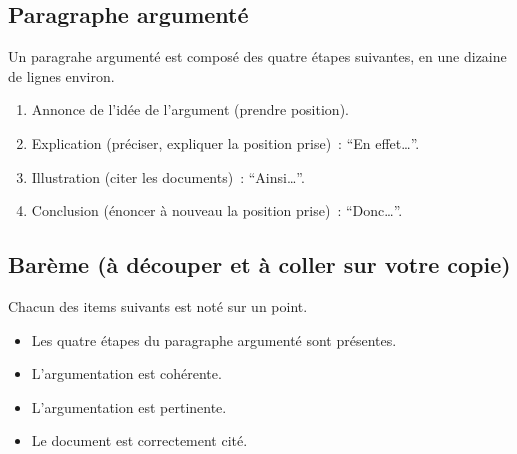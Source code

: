 \documentclass[11pt]{article}
\newcommand{\cuthere}{\noindent%
  \dotfill \raisebox{-.25em}{\faScissors}%
  \dotfill \raisebox{-.25em}{\faScissors}%
  \dotfill \raisebox{-.25em}{\faScissors}%
  \dotfill \raisebox{-.25em}{\faScissors}%
  \dotfill}
\begin{document}
\subsection*{Paragraphe argumenté}

\noindent Un paragrahe argumenté est composé des quatre étapes suivantes, en une dizaine de lignes environ.

\begin{enumerate}
\item Annonce de l'idée de l'argument (prendre position).
\item Explication (préciser, expliquer la position prise) : \enquote{En effet…}.
\item Illustration (citer les documents) : \enquote{Ainsi…}.
\item Conclusion (énoncer à nouveau la position prise) : \enquote{Donc…}.
\end{enumerate}

\cuthere

\subsection*{Barème (à découper et à coller sur votre copie)}

\noindent Chacun des items suivants est noté sur un point.

\begin{itemize}[$\ldots/1$]
\item Les quatre étapes du paragraphe argumenté sont présentes.
\item L'argumentation est cohérente.
\item L'argumentation est pertinente.
\item Le document est correctement cité.
\end{itemize}
\end{document}
